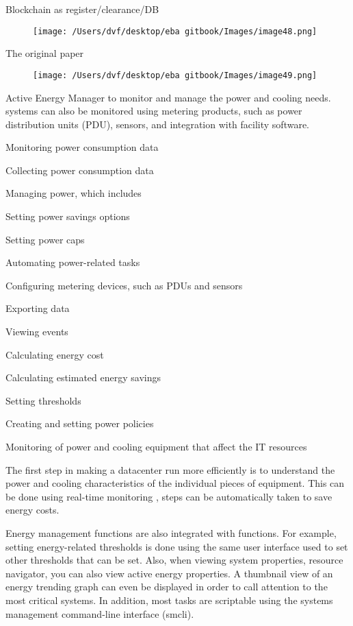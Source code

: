 \documentclass[]{book}
\theoremstyle{definition}
\theoremstyle{definition}
\theoremstyle{definition}
\theoremstyle{remark}
\begin{document}
Blockchain as register/clearance/DB

\begin{figure}[htbp]
\centering
\texttt{[image: /Users/dvf/desktop/eba gitbook/Images/image48.png]}
\caption{}
\end{figure}

The original paper

\begin{figure}[htbp]
\centering
\texttt{[image: /Users/dvf/desktop/eba gitbook/Images/image49.png]}
\caption{}
\end{figure}

Active Energy Manager to monitor and manage the power and cooling needs.
systems can also be monitored using metering products, such as power
distribution units (PDU), sensors, and integration with facility
software.

Monitoring power consumption data

Collecting power consumption data

Managing power, which includes

Setting power savings options

Setting power caps

Automating power-related tasks

Configuring metering devices, such as PDUs and sensors

Exporting data

Viewing events

Calculating energy cost

Calculating estimated energy savings

Setting thresholds

Creating and setting power policies

Monitoring of power and cooling equipment that affect the IT resources

The first step in making a datacenter run more efficiently is to
understand the power and cooling characteristics of the individual
pieces of equipment. This can be done using real-time monitoring , steps
can be automatically taken to save energy costs.

Energy management functions are also integrated with functions. For
example, setting energy-related thresholds is done using the same user
interface used to set other thresholds that can be set. Also, when
viewing system properties, resource navigator, you can also view active
energy properties. A thumbnail view of an energy trending graph can even
be displayed in order to call attention to the most critical systems. In
addition, most tasks are scriptable using the systems management
command-line interface (smcli).
\end{document}
